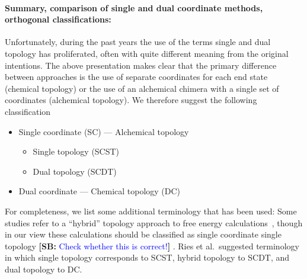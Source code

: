 \documentclass[9pt,bestpractices,pubversion]{livecoms}
\newcommand{\sbnote}[1]{%
  {\bfseries{}[SB: }%
  {\textcolor{blue}{#1}}{\bfseries{}]}
  }
\begin{document}
\paragraph{Summary, comparison of single and dual coordinate methods, orthogonal classifications:}


Unfortunately, during the past years the use of the terms single and dual topology has proliferated, often with quite different meaning from the original intentions. The above presentation makes clear that the primary difference between approaches is the use of separate coordinates for each end state (chemical topology) or the use of an alchemical chimera with a single set of coordinates (alchemical topology). We therefore suggest the following classification
\begin{itemize}
\item Single coordinate (SC) --- Alchemical topology
  \begin{itemize}
  \item Single topology (SCST)
    \item Dual topology (SCDT)
  \end{itemize}
  \item Dual coordinate --- Chemical topology (DC)
  \end{itemize}
For completeness, we list some additional terminology that has been used: Some studies refer to a ``hybrid'' topology approach to free energy calculations~\cite{gapsys2015pmx, gapsys2016accurate, gapsys2020large}, though in our view these calculations should be classified as single coordinate single topology \sbnote{Check whether this is correct!}. %
Ries et al.\ suggested terminology \cite{Ries_2022} in which single topology corresponds to SCST, hybrid topology to SCDT, and dual topology to DC.
\end{document}
